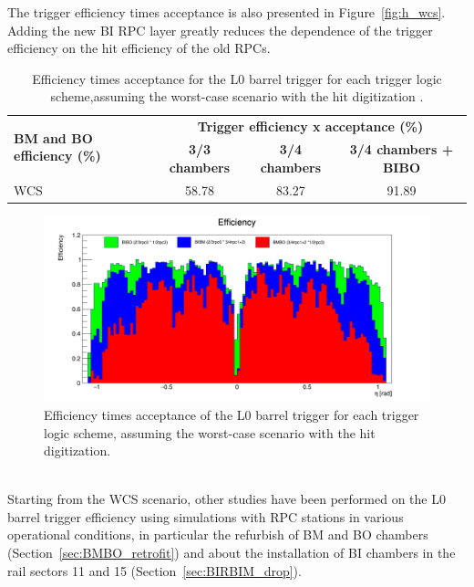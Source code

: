 The trigger efficiency times acceptance is also presented in Figure~\ref{fig:h_wcs}. 
Adding the new BI RPC layer greatly reduces the dependence of the trigger efficiency on the hit efficiency of the old RPCs.
\begin{table}[h]
		\small
\begin{tabular}{l|c|c|c}
	\hline
	\multirow{2}{*}{\textbf{BM and BO efficiency (\%)}} & \multicolumn{3}{c}{\textbf{Trigger efficiency x acceptance (\%)}}\\
	\cline{2-4}   
	& \textbf{3/3 chambers} & \textbf{3/4 chambers} & \textbf{3/4 chambers + BIBO}\\
	\hline 
	WCS 												& 58.78 				& 83.27 		& 91.89\\
	\hline 
\end{tabular} 
\caption{Efficiency times acceptance for the L0 barrel trigger for each trigger logic scheme,assuming the worst-case scenario with the hit digitization  .} 
\label{tab:eff_x_acc_wcs}
\end{table} 
\begin{figure}[!h]
	\centering
	\includegraphics[width=1.1\textwidth]{Chapters/CH3/figures/h_eff}
	\caption{Efficiency times acceptance of the L0 barrel trigger for each trigger logic scheme, assuming the worst-case scenario with the hit digitization.}
	\label{fig:h_eff}
\end{figure}
\\Starting from the WCS scenario, other studies have been performed on the L0 barrel trigger 
efficiency using simulations with RPC stations in various operational conditions, in particular the 
refurbish of BM and BO chambers (Section~\ref{sec:BMBO_retrofit}) and about the installation of BI chambers in the rail sectors 11 and 15 (Section~\ref{sec:BIRBIM_drop}).

